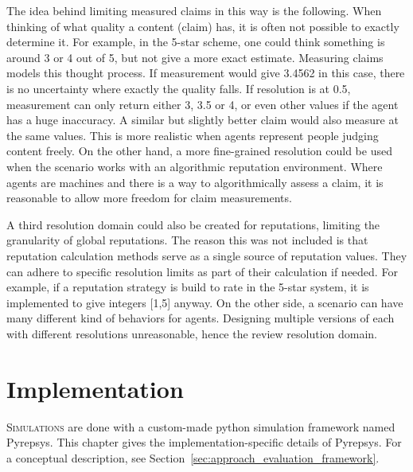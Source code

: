 \documentclass[%
    ]{\PathToTumTemplate/thesis/tum_thesis}
\begin{document}
The idea behind limiting measured claims in this way is the following.
When thinking of what quality a content (claim) has, it is often not possible to exactly determine it.
For example, in the 5-star scheme, one could think something is around 3 or 4 out of 5, but not give a more exact estimate.
Measuring claims models this thought process.
If measurement would give 3.4562 in this case, there is no uncertainty where exactly the quality falls.
If resolution is at 0.5, measurement can only return either 3, 3.5 or 4, or even other values if the agent has a huge inaccuracy.
A similar but slightly better claim would also measure at the same values.
This is more realistic when agents represent people judging content freely.
On the other hand, a more fine-grained resolution could be used when the scenario works with an algorithmic reputation environment.
Where agents are machines and there is a way to algorithmically assess a claim, it is reasonable to allow more freedom for claim measurements.

A third resolution domain could also be created for reputations, limiting the granularity of global reputations.
The reason this was not included is that reputation calculation methods serve as a single source of reputation values.
They can adhere to specific resolution limits as part of their calculation if needed.
For example, if a reputation strategy is build to rate in the 5-star system, it is implemented to give integers [1,5] anyway.
On the other side, a scenario can have many different kind of behaviors for agents.
Designing multiple versions of each with different resolutions unreasonable, hence the review resolution domain.




\chapter{Implementation}\label{chap:implementation}

\lettrine{S}{imulations} are done with a custom-made python simulation framework named Pyrepsys.
This chapter gives the implementation-specific details of Pyrepsys. 
For a conceptual description, see Section~\ref{sec:approach_evaluation_framework}.
\end{document}
